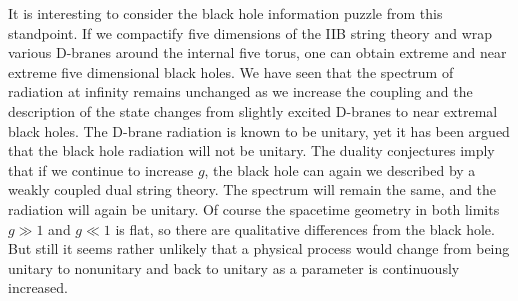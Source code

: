 \documentclass[12pt]{article}
\begin{document}
It is interesting to consider the black hole information puzzle 
 from this standpoint. If we compactify five dimensions of the IIB string theory
and wrap various D-branes around the internal five torus, one can obtain
extreme and near extreme five dimensional black holes.
We have seen that the spectrum of radiation at infinity
remains unchanged as we
increase the coupling and the description of the state changes from
slightly excited D-branes to near extremal black holes.
The D-brane radiation
is known to be unitary, yet it has been argued that the black hole
radiation will not be unitary. The duality conjectures imply that
if we continue to increase $g$,
the black hole can again we described by a weakly coupled dual string
theory. The spectrum will remain the same, and the radiation will again be
unitary. Of course the spacetime geometry in both limits $g\gg 1$ and
$g \ll 1$ is flat, so there are qualitative differences from the black hole.
But
still it seems rather unlikely that a physical process would change from
being unitary to nonunitary and back to unitary as a parameter is continuously
increased.
\end{document}
